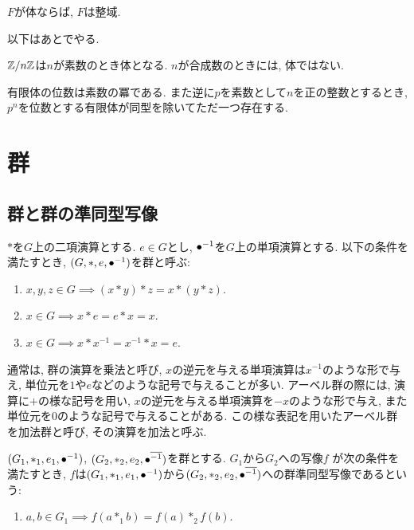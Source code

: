 \begin{prop}
  $F$が体ならば, $F$は整域.
\end{prop}


以下はあとでやる.
\begin{prop}
  $\mathbb{Z}/n\mathbb{Z}$は$n$が素数のとき体となる.
  $n$が合成数のときには, 体ではない.
\end{prop}

\begin{prop}
  有限体の位数は素数の冪である.
  また逆に$p$を素数として$n$を正の整数とするとき,
  $p^n$を位数とする有限体が同型を除いてただ一つ存在する.
\end{prop}

\chapter{群}
\section{群と群の準同型写像}
\begin{definition}[再掲]
  $\ast$を$G$上の二項演算とする.
  $e\in G$とし,
  ${\bullet}^{-1}$を$G$上の単項演算とする.
  以下の条件を満たすとき,
  $(G,\ast,e,{\bullet}^{-1})$を群と呼ぶ:
  \begin{enumerate}
  \item $x,y,z\in G\implies (x\ast y) \ast z = x\ast (y\ast z)$.
  \item $x\in G\implies x\ast e=e\ast x =x$.
  \item $x\in G \implies x\ast x^{-1}=x^{-1}\ast x =e$.
  \end{enumerate}
\end{definition}
\begin{remark}
  通常は,
  群の演算を乗法と呼び,
  $x$の逆元を与える単項演算は$x^{-1}$のような形で与え,
  単位元を$1$や$e$などのような記号で与えることが多い.
  アーベル群の際には,
  演算に$+$の様な記号を用い,
  $x$の逆元を与える単項演算を$-x$のような形で与え,
  また単位元を$0$のような記号で与えることがある.
  この様な表記を用いたアーベル群を加法群と呼び,
  その演算を加法と呼ぶ.
\end{remark}




\begin{definition}
  $(G_1,\ast_1,e_1,{\bullet}^{-1})$,
  $(G_2,\ast_2,e_2,{\bullet}^{\overline{-1}})$を群とする.
  $G_1$から$G_2$への写像$f$
  が次の条件を満たすとき,
  $f$は$(G_1,\ast_1,e_1,{\bullet}^{-1})$から$(G_2,\ast_2,e_2,{\bullet}^{\overline{-1}})$への群準同型写像であるという:
  \begin{enumerate}
  \item $a,b\in G_1 \implies f(a\ast_1 b) = f(a)\ast_2 f(b)$.
  \end{enumerate}
\end{definition}

